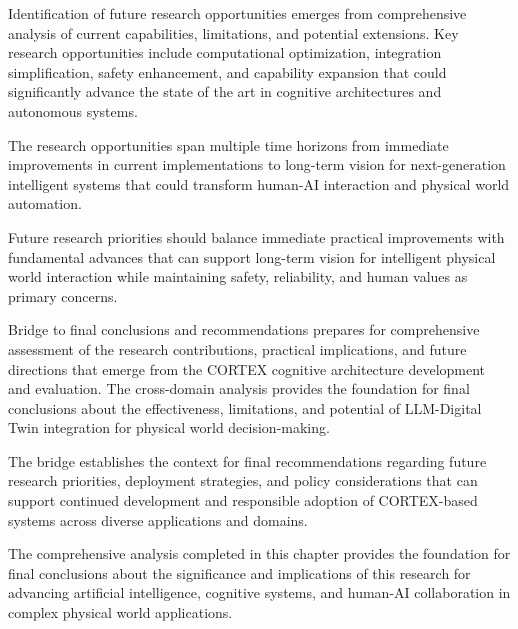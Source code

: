 Identification of future research opportunities emerges from comprehensive analysis of current capabilities, limitations, and potential extensions. Key research opportunities include computational optimization, integration simplification, safety enhancement, and capability expansion that could significantly advance the state of the art in cognitive architectures and autonomous systems.

The research opportunities span multiple time horizons from immediate improvements in current implementations to long-term vision for next-generation intelligent systems that could transform human-AI interaction and physical world automation.

Future research priorities should balance immediate practical improvements with fundamental advances that can support long-term vision for intelligent physical world interaction while maintaining safety, reliability, and human values as primary concerns.

Bridge to final conclusions and recommendations prepares for comprehensive assessment of the research contributions, practical implications, and future directions that emerge from the CORTEX cognitive architecture development and evaluation. The cross-domain analysis provides the foundation for final conclusions about the effectiveness, limitations, and potential of LLM-Digital Twin integration for physical world decision-making.

The bridge establishes the context for final recommendations regarding future research priorities, deployment strategies, and policy considerations that can support continued development and responsible adoption of CORTEX-based systems across diverse applications and domains.

The comprehensive analysis completed in this chapter provides the foundation for final conclusions about the significance and implications of this research for advancing artificial intelligence, cognitive systems, and human-AI collaboration in complex physical world applications.

